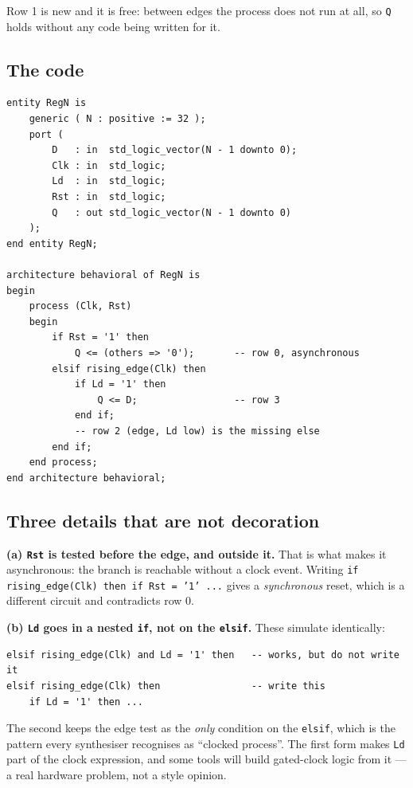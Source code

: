 \documentclass[11pt]{article}
\newcommand{\code}[1]{\texttt{#1}}
\begin{document}
Row 1 is new and it is free: between edges the process does not run at all, so
\code{Q} holds without any code being written for it.

\subsection*{The code}

\begin{lstlisting}
entity RegN is
    generic ( N : positive := 32 );
    port (
        D   : in  std_logic_vector(N - 1 downto 0);
        Clk : in  std_logic;
        Ld  : in  std_logic;
        Rst : in  std_logic;
        Q   : out std_logic_vector(N - 1 downto 0)
    );
end entity RegN;

architecture behavioral of RegN is
begin
    process (Clk, Rst)
    begin
        if Rst = '1' then
            Q <= (others => '0');       -- row 0, asynchronous
        elsif rising_edge(Clk) then
            if Ld = '1' then
                Q <= D;                 -- row 3
            end if;
            -- row 2 (edge, Ld low) is the missing else
        end if;
    end process;
end architecture behavioral;
\end{lstlisting}

\subsection*{Three details that are not decoration}

\textbf{(a) \code{Rst} is tested before the edge, and outside it.} That is what
makes it asynchronous: the branch is reachable without a clock event. Writing
\code{if rising\_edge(Clk) then if Rst = '1' ...} gives a \emph{synchronous} reset,
which is a different circuit and contradicts row 0.

\textbf{(b) \code{Ld} goes in a nested \code{if}, not on the \code{elsif}.} These
simulate identically:

\begin{lstlisting}
elsif rising_edge(Clk) and Ld = '1' then   -- works, but do not write it
elsif rising_edge(Clk) then                -- write this
    if Ld = '1' then ...
\end{lstlisting}

The second keeps the edge test as the \emph{only} condition on the \code{elsif},
which is the pattern every synthesiser recognises as ``clocked process''. The
first form makes \code{Ld} part of the clock expression, and some tools will build
gated-clock logic from it --- a real hardware problem, not a style opinion.
\end{document}
